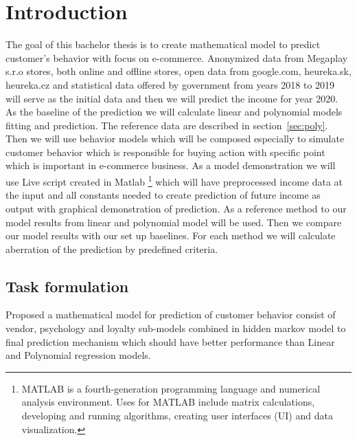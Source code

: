 
{}

\chapter*{Introduction}
The goal of this bachelor thesis is to create mathematical model to predict customer’s behavior with focus on e-commerce.
Anonymized data from Megaplay s.r.o stores, both online and offline stores, open data from google.com,
heureka.sk, heureka.cz and statistical data offered by government from years 2018 to 2019 will serve as the initial data
and then we will predict the income for year 2020.
As the baseline of the prediction we will calculate linear and polynomial models fitting and prediction.
The reference data are described in section~\ref{sec:poly}.
Then we will use behavior models which will be composed especially to simulate customer behavior which is responsible for
buying action with specific point which is important in e-commerce business.
As a model demonstration we will use  Live script created in Matlab \footnote{MATLAB is a fourth-generation programming
language and numerical analysis environment.
Uses for MATLAB include matrix calculations, developing and running algorithms, creating user interfaces (UI) and data visualization.}
which will have preprocessed income data at the input and all constants needed to create prediction of future income as output with graphical demonstration of prediction.
As a reference method to our model results from linear and polynomial model will be used.
Then we compare our model results with our set up baselines.
For each method we will calculate aberration of the prediction by predefined criteria.

\section*{Task formulation}

Proposed a mathematical model for prediction of customer behavior consist of vendor, psychology and loyalty sub-models combined
in hidden markov model to final prediction mechanism which should have better performance than Linear and Polynomial regression models.
